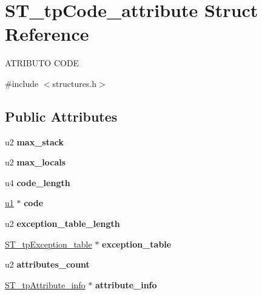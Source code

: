 \hypertarget{structST__tpCode__attribute}{}\section{S\+T\+\_\+tp\+Code\+\_\+attribute Struct Reference}
\label{structST__tpCode__attribute}




 A\+T\+R\+I\+B\+U\+TO C\+O\+DE  




{\ttfamily \#include $<$structures.\+h$>$}

\subsection*{Public Attributes}
\begin{DoxyCompactItemize}
\item 
\mbox{\label{structST__tpCode__attribute_a3bac9939f09457974879db36c6137996}} 
u2 {\bfseries max\+\_\+stack}
\item 
\mbox{\label{structST__tpCode__attribute_abf5afe9a40fd538e6570494efc7b4c41}} 
u2 {\bfseries max\+\_\+locals}
\item 
\mbox{\label{structST__tpCode__attribute_ac481c9015a468295e6ff5e1336a1c3de}} 
u4 {\bfseries code\+\_\+length}
\item 
\mbox{\label{structST__tpCode__attribute_ab05c42d97bef6eb88663793d5dce78dd}} 
\mbox{\hyperlink{structures_8h_ad9f4cdb6757615aae2fad89dab3c5470}{u1}} $\ast$ {\bfseries code}
\item 
\mbox{\label{structST__tpCode__attribute_a2c614d7d62ef5c81dc452d244cfe49bf}} 
u2 {\bfseries exception\+\_\+table\+\_\+length}
\item 
\mbox{\label{structST__tpCode__attribute_a5c29c5643d98c80ec1b3841b8c987f54}} 
\mbox{\hyperlink{structures_8h_a19e8dd42ee1a3c672cdde6ef9287cbc5}{S\+T\+\_\+tp\+Exception\+\_\+table}} $\ast$ {\bfseries exception\+\_\+table}
\item 
\mbox{\label{structST__tpCode__attribute_a686ecddebd6fbb3286b15af4a7140ba3}} 
u2 {\bfseries attributes\+\_\+count}
\item 
\mbox{\label{structST__tpCode__attribute_afc495840b676d8550ba629924a921619}} 
\mbox{\hyperlink{structures_8h_a4ad50728b2ffc8af625f1237e03bc9e0}{S\+T\+\_\+tp\+Attribute\+\_\+info}} $\ast$ {\bfseries attribute\+\_\+info}
\end{DoxyCompactItemize}


